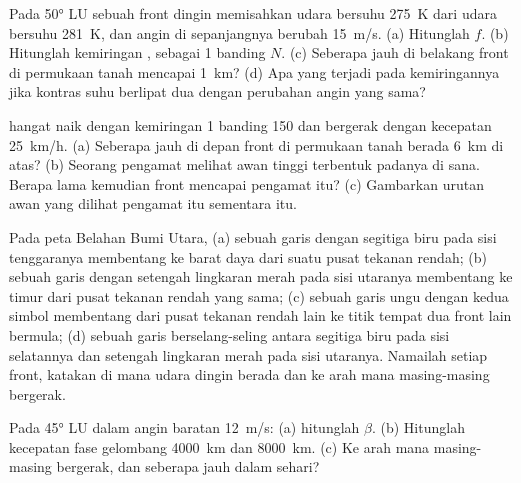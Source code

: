 \begin{exercise}[$\star$]\label{exo:b2:weather-systems:1}
Pada \ang{50} LU sebuah front dingin memisahkan udara bersuhu \qty{275}{K} dari udara bersuhu \qty{281}{K}, dan angin
di sepanjangnya berubah \qty{15}{m/s}. (a) Hitunglah $f$. (b) Hitunglah kemiringan ,
sebagai 1 banding $N$. (c) Seberapa jauh di belakang front di permukaan tanah  mencapai
\qty{1}{km}? (d) Apa yang terjadi pada kemiringannya jika kontras suhu berlipat dua dengan perubahan angin
yang sama?
\end{exercise}

\begin{exercise}[$\star$]\label{exo:b2:weather-systems:2}
 hangat naik dengan kemiringan 1 banding 150 dan bergerak dengan kecepatan \qty{25}{km/h}. (a) Seberapa jauh di depan
front di permukaan tanah  berada \qty{6}{km} di atas? (b) Seorang pengamat melihat awan tinggi terbentuk
padanya di sana. Berapa lama kemudian front mencapai pengamat itu? (c) Gambarkan urutan
awan yang dilihat pengamat itu sementara itu.
\end{exercise}

\begin{exercise}[$\star$]\label{exo:b2:weather-systems:3}
Pada peta Belahan Bumi Utara, (a) sebuah garis dengan segitiga biru pada sisi tenggaranya membentang ke barat daya
dari suatu pusat tekanan rendah; (b) sebuah garis dengan setengah lingkaran merah pada sisi utaranya membentang ke timur dari pusat tekanan rendah yang sama; (c)
sebuah garis ungu dengan kedua simbol membentang dari pusat tekanan rendah lain ke titik tempat dua front lain bermula;
(d) sebuah garis berselang-seling antara segitiga biru pada sisi selatannya dan setengah lingkaran merah pada sisi utaranya.
Namailah setiap front, katakan di mana udara dingin berada dan ke arah mana masing-masing bergerak.
\end{exercise}

\begin{exercise}[$\star$]\label{exo:b2:weather-systems:4}
Pada \ang{45} LU dalam angin baratan \qty{12}{m/s}: (a) hitunglah $\beta$. (b) Hitunglah kecepatan fase
gelombang \qty{4000}{km} dan \qty{8000}{km}. (c) Ke arah mana masing-masing bergerak, dan seberapa jauh dalam
sehari?
\end{exercise}

